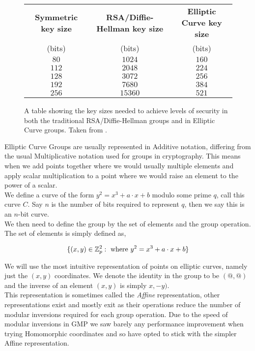 \documentclass[ %
                    author={Nicholas Tutte},
                supervisor={Prof. Nigel Smart},
                    degree={MEng},
                     title={Secure Two Party Computation},
                  subtitle={A practical comparison of recent protocols},
                      type={Research - GG1K},
                      year={2015} ]{dissertation}
\begin{document}
			\begin{figure}[!htb]
				\begin{tabular}{| c | c | c |}
					\hline
					\textbf{Symmetric key size} & \textbf{RSA/Diffie-Hellman key size} & \textbf{Elliptic Curve key size} \\
					(bits) & (bits) & (bits) \\
					\hline
					\hline
					$80$ & $1024$ & $160$ \\
					\hline
					$112$ & $2048$ & $224$ \\
					\hline
					$128$ & $3072$ & $256$ \\
					\hline
					$192$ & $7680$ & $384$ \\
					\hline
					$256$ & $15360$ & $521$ \\
					\hline
				\end{tabular}

				\caption{A table showing the key sizes needed to achieve levels of security in both the traditional RSA/Diffie-Hellman groups and in Elliptic Curve groups. Taken from \cite{NSA_CaseForECC}. \label{fig:NSA_ECC_Table}}
			\end{figure}

			Elliptic Curve Groups are usually represented in Additive notation, differing from the usual Multiplicative notation used for groups in cryptography. This means when we add points together where we would usually multiple elements and apply scalar multiplication to a point where we would raise an element to the power of a scalar.\\

			We define a curve of the form $y^2 = x^3 + a\cdot x + b$ modulo some prime $q$, call this curve $C$. Say $n$ is the number of bits required to represent $q$, then we say this is an $n$-bit curve.\\

			We then need to define the group by the set of elements and the group operation. The set of elements is simply defined as,

			$$\{(x, y) \in \mathbb{Z}_p^2 : \textnormal{ where } y^2 = x^3 + a\cdot x + b\} $$

			We will use the most intuitive representation of points on elliptic curves, namely just the $(x, y)$ coordinates. We denote the identity in the group to be $(@, @)$ and the inverse of an element $(x, y)$ is simply $x, -y)$.\\

			This representation is sometimes called the \emph{Affine} representation, other representations exist and mostly exit as their operations reduce the number of modular inversions required for each group operation. Due to the speed of modular inversions in GMP we saw barely any performance improvement when trying Homomorphic coordinates and so have opted to stick with the simpler Affine representation.\\
\end{document}
